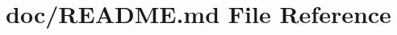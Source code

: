 \hypertarget{_r_e_a_d_m_e_8md}{}\section{doc/\+R\+E\+A\+D\+M\+E.md File Reference}
\label{_r_e_a_d_m_e_8md}
